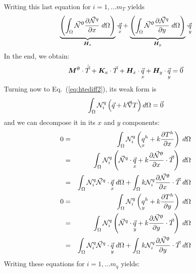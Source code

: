 Writing this last equation for $i=1,...m_T$ yields
\[
\underbrace{\left( \int_\Omega \vec{{\mathcal{N}}}^\uptheta \frac{\partial \vec{{\mathcal{N}}}^q}{\partial x} \; d\Omega \right)}_{{\bm H}_x} \cdot\vec{\underset{\tiny x}{q}}+ 
\underbrace{\left( \int_\Omega \vec{{\mathcal{N}}}^\uptheta \frac{\partial \vec{{\mathcal{N}}}^q}{\partial y} \; d\Omega\right)}_{{\bm H}_y} \cdot \vec{\underset{\tiny y}{q}}
\]
In the end, we obtain:
\begin{equation}
{\bm M}^\uptheta \cdot \dot{\vec{T}} + {\bm K}_a \cdot \vec{T} 
+ {\bm H}_x \cdot \vec{\underset{\tiny x}{q}}
+ {\bm H}_y \cdot \vec{\underset{\tiny y}{q}}
=\vec{0} \label{eq:htediff3}
\end{equation}
Turning now to Eq.~(\ref{eq:htediff2}), its weak form is
\[
\int_\Omega {\mathcal{N}}_i^q \left( \vec{q} + k \vec \nabla T \right) d\Omega = \vec{0}
\]
and we can decompose it in its $x$ and $y$ components:
\begin{eqnarray}
0&=&\int_\Omega {\mathcal{N}}_i^q \left( \underset{\tiny x}{q}^h + k  \frac{\partial T^h}{\partial x} \right) \; d\Omega  \nonumber\\
&=& \int_\Omega {\mathcal{N}}_i^q \left( \vec{{\mathcal{N}}}^q \cdot \vec{\underset{\tiny x}{q}} 
+ k  \frac{\partial \vec{{\mathcal{N}}}^\uptheta}{\partial x} \cdot \vec{T} \right) \; d\Omega \nonumber\\ 
&=& \int_\Omega {\mathcal{N}}_i^q \vec{{\mathcal{N}}}^q \cdot \vec{\underset{\tiny x}{q}} \; d\Omega  
+ \int _\Omega k {\mathcal{N}}_i^q   \frac{\partial \vec{{\mathcal{N}}}^\uptheta}{\partial x}\cdot \vec{T} \;  d\Omega \nonumber\\ 
0&=&\int_\Omega {\mathcal{N}}_i^q \left( \underset{\tiny y}{q}^h + k  \frac{\partial T^h}{\partial y} \right) \;  d\Omega \nonumber\\
&=& \int_\Omega {\mathcal{N}}_i^q \left( \vec{{\mathcal{N}}}^q \cdot \vec{\underset{\tiny y}{q}} 
+ k  \frac{\partial \vec{{\mathcal{N}}}^\uptheta}{\partial y} \cdot \vec{T} \right) \;  d\Omega \nonumber\\ 
&=& \int_\Omega {\mathcal{N}}_i^q \vec{{\mathcal{N}}}^q \cdot \vec{\underset{\tiny y}{q}} \; d\Omega
+ \int _\Omega k {\mathcal{N}}_i^q   \frac{\partial \vec{{\mathcal{N}}}^\uptheta}{\partial y} \cdot \vec{T} \;  d\Omega 
\end{eqnarray}
Writing these equations for $i=1,...m_q$ yields:
